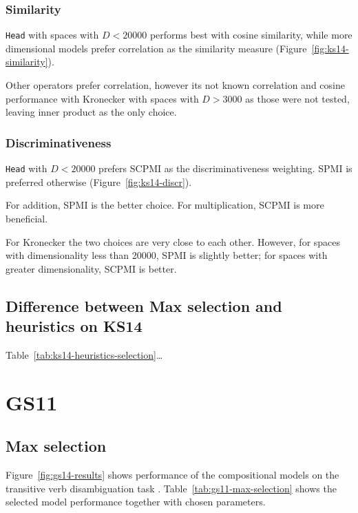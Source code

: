 \subsubsection{Similarity}
\texttt{Head} with spaces with $D < 20000$ performs best with cosine similarity, while more dimensional models prefer correlation as the similarity measure (Figure~\ref{fig:ks14-similarity}).

Other operators prefer correlation, however its not known correlation and cosine performance with Kronecker with spaces with $D > 3000$ as those were not tested, leaving inner product as the only choice.

\subsubsection{Discriminativeness}


\texttt{Head} with $D < 20000$ prefers SCPMI as the discriminativeness weighting. SPMI is preferred otherwise (Figure~\ref{fig:ks14-discr}).

For addition, SPMI is the better choice. For multiplication, SCPMI is more beneficial.

For Kronecker the two choices are very close to each other. However, for spaces with dimensionality less than 20000, SPMI is slightly better; for spaces with greater dimensionality, SCPMI is better.

\subsection{Difference between Max selection and heuristics on KS14}


Table~\ref{tab:ks14-heuristics-selection}\ldots

% 

\section{GS11}
\label{sec:gs11}

\subsection{Max selection}
\label{sec:max-selection-gs11}



Figure~\ref{fig:gs14-results} shows performance of the compositional models on the transitive verb disambiguation task \cite{Grefenstette:2011:ESC:2145432.2145580}. Table~\ref{tab:gs11-max-selection} shows the selected model performance together with chosen parameters.

